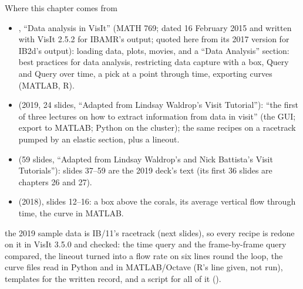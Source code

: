 \documentclass[aspectratio=169,11pt]{beamer}
\begin{document}
\begin{frame}{Where this chapter comes from}
\label{fr:sources}
\scriptsize
\begin{itemize}
  \item {}, ``Data analysis in VisIt'' (MATH 769; dated 16 February 2015 and written with VisIt 2.5.2 for IBAMR's output; quoted here from its 2017 version for IB2d's  output): loading data, plots, movies, and a ``Data Analysis'' section: best practices for data analysis, restricting data capture with a box, Query and Query over time, a pick at a point through time, exporting curves (MATLAB, R).
  \item {} (2019, 24 slides, ``Adapted from Lindsay Waldrop's Visit Tutorial''): ``the first of three lectures on how to extract information from data in visit'' (the GUI; export to MATLAB; Python on the cluster); the same recipes on a racetrack pumped by an elastic section, plus a lineout.
  \item {} (59 slides, ``Adapted from Lindsay Waldrop's and Nick Battista's Visit Tutorials''): slides 37--59 are the 2019 deck's text (its first 36 slides are chapters 26 and 27).
  \item {} (2018), slides 12--16: a box above the corals, its average vertical flow through time, the curve in MATLAB.
\end{itemize}
 the 2019 sample data is IB/11's racetrack (next slides), so every recipe is redone on it in VisIt 3.5.0 and checked: the time query and the frame-by-frame query compared, the lineout turned into a flow rate on six lines round the loop, the curve files read in Python and in MATLAB/Octave (R's line given, not run), templates for the written record, and a script for all of it ().
\end{frame}
\end{document}
